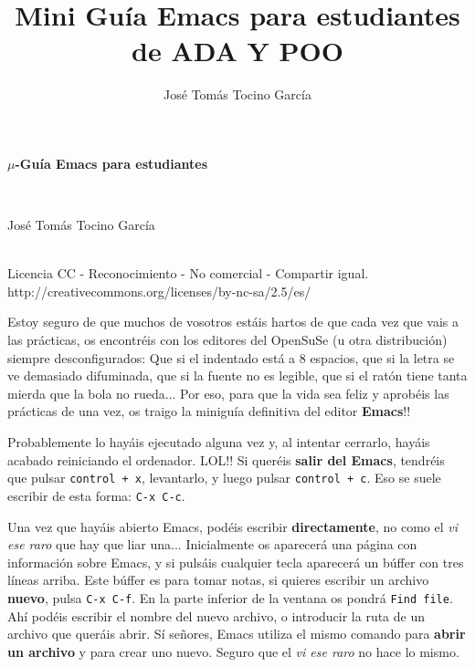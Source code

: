 \documentclass[landscape]{article}
\title{Mini Guía Emacs para estudiantes de ADA Y POO}
\author{José Tomás Tocino García}
\date{}
\begin{document}
\pagestyle{empty}
\begin{multicols*}{2}

\begin{center}
\begin{Large}\textbf{$\mu$-Guía Emacs para estudiantes}\end{Large}\\
\begin{large}José Tomás Tocino García\end{large}\\[0.1cm]

{\small Licencia CC - Reconocimiento - No comercial - Compartir igual.\\
http://creativecommons.org/licenses/by-nc-sa/2.5/es/}
 
\end{center}

Estoy seguro de que muchos de vosotros estáis hartos de que cada vez que vais a las prácticas, os encontréis con los editores del OpenSuSe (u otra distribución) siempre desconfigurados: Que si el indentado está a 8 espacios, que si la letra se ve demasiado difuminada, que si la fuente no es legible, que si el ratón tiene tanta mierda que la bola no rueda... Por eso, para que la vida sea feliz y aprobéis las prácticas de una vez, os traigo la miniguía definitiva del editor \textbf{Emacs}!! 

Probablemente lo hayáis ejecutado alguna vez y, al intentar cerrarlo, hayáis acabado reiniciando el ordenador. LOL!! Si queréis \textbf{salir del Emacs}, tendréis que pulsar \texttt{control + x}, levantarlo, y luego pulsar \texttt{control + c}. Eso se suele escribir de esta forma: \texttt{C-x C-c}. 

Una vez que hayáis abierto Emacs, podéis escribir \textbf{directamente}, no como el \textit{vi ese raro} que hay que liar una... Inicialmente os aparecerá una página con información sobre Emacs, y si pulsáis cualquier tecla aparecerá un búffer con tres líneas arriba. Este búffer es para tomar notas, si quieres escribir un archivo \textbf{nuevo}, pulsa \texttt{C-x C-f}. En la parte inferior de la ventana os pondrá \texttt{Find file}. Ahí podéis escribir el nombre del nuevo archivo, o introducir la ruta de un archivo que queráis abrir. Sí señores, Emacs utiliza el mismo comando para \textbf{abrir un archivo} y para crear uno nuevo. Seguro que el \textit{vi ese raro} no hace lo mismo.


\end{multicols*}
\end{document}
